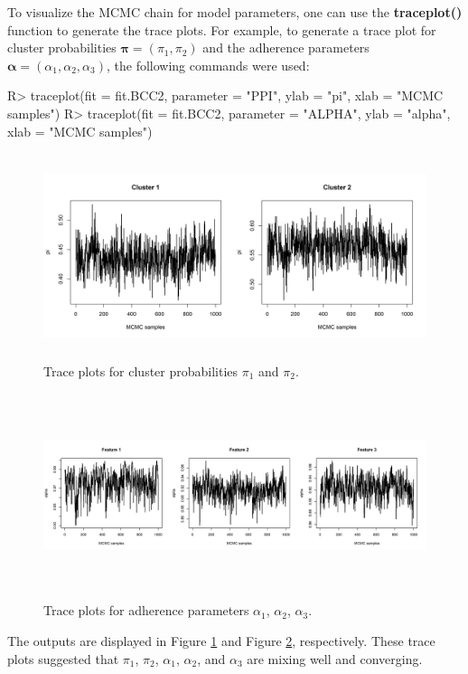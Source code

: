 To visualize the MCMC chain for model parameters, one can use the  \textbf{traceplot()} function to generate the trace plots. For example, to generate a trace plot for cluster probabilities $\boldsymbol{\pi} = (\pi_1, \pi_2)$ and the adherence parameters $\boldsymbol{\alpha}=(\alpha_1,\alpha_2,\alpha_3)$, the following commands were used: 
\begin{example}
R> traceplot(fit = fit.BCC2, parameter = "PPI", ylab = "pi", xlab = "MCMC samples")
R> traceplot(fit = fit.BCC2, parameter = "ALPHA", ylab = "alpha", xlab = "MCMC samples")
\end{example} 
\begin{figure}[h]
\centering
\includegraphics[width=\textwidth,height=6cm]{./Figures/trace_ppi.JPEG}
\caption{\label{fig:trace_ppi}  Trace plots for cluster probabilities $\pi_1$ and $\pi_2$.}
\end{figure}
\begin{figure}[h]
\centering
\includegraphics[width=\textwidth,height=6cm]{./Figures/trace_alpha.JPEG}
\caption{\label{fig:trace_alpha}  Trace plots for adherence parameters $\alpha_1$, $\alpha_2$, $\alpha_3$.}
\end{figure}
The outputs are displayed in Figure \ref{fig:trace_ppi} and Figure \ref{fig:trace_alpha}, respectively. These trace plots suggested that $\pi_1$, $\pi_2$, $\alpha_1$, $\alpha_2$, and $\alpha_3$ are mixing well and converging. 
